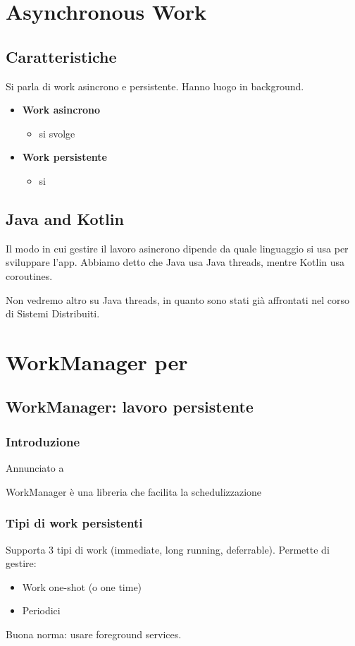 \chapter{Asynchronous Work}
\section{Caratteristiche}
Si parla di work asincrono e persistente. Hanno luogo in background.
\begin{itemize}
    \item \textbf{Work asincrono}
    \begin{itemize}
        \item si svolge
    \end{itemize}
    \item \textbf{Work persistente}
    \begin{itemize}
        \item si
    \end{itemize}
\end{itemize}

\section{Java and Kotlin}
Il modo in cui gestire il lavoro asincrono dipende da quale linguaggio si usa per sviluppare l'app. Abbiamo detto che Java usa Java threads, mentre Kotlin usa coroutines.
\par Non vedremo altro su Java threads, in quanto sono stati già affrontati nel corso di Sistemi Distribuiti.

\chapter{WorkManager per}
\section{WorkManager: lavoro persistente}
\subsection{Introduzione}
\par Annunciato a 
\par WorkManager è una libreria che facilita la schedulizzazione 

\subsection{Tipi di work persistenti}
Supporta 3 tipi di work (immediate, long running, deferrable).
Permette di gestire:
\begin{itemize}
    \item Work one-shot (o one time)
    \item Periodici
\end{itemize}
Buona norma: usare foreground services.

